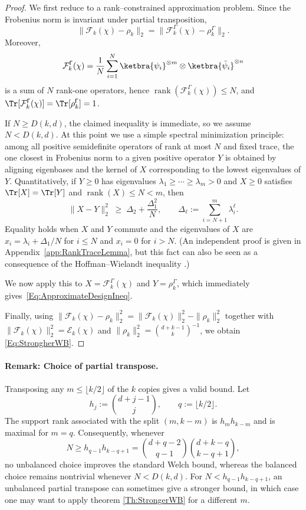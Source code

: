\documentclass[aps,twocolumn,pra,superscriptaddress,nofootinbib]{revtex4-2}
\begin{document}
\begin{proof}
We first reduce to a rank--constrained approximation problem.
Since the Frobenius norm is invariant under partial transposition,
\[
\|\mathcal F_k(\chi)-\rho_k\|_2=\|\mathcal F_{k}^{\mathsf{\Gamma}}(\chi)-\rho_k^{\mathsf{\Gamma}}\|_2.
\]
Moreover,
\[
\mathcal F_{k}^{\mathsf{\Gamma}}(\chi)
=\frac{1}{N}\sum_{i=1}^N
\ketbra{\psi_i}^{\otimes m}\otimes \ketbra{\bar\psi_i}^{\otimes n}
\]
is a sum of $N$ rank-one operators, hence $\operatorname{rank}(\mathcal F_{k}^{\mathsf{\Gamma}}(\chi))\le N$, and
$\Tr[\mathcal F_{k}^{\mathsf{\Gamma}}(\chi)]=\Tr[\rho_k^{\mathsf{\Gamma}}]=1$.

{If $N\ge D(k,d)$, the claimed inequality is immediate, so we assume $N<D(k,d)$.}
At this point we use a simple spectral minimization principle: among all positive semidefinite operators of rank at
most $N$ and fixed trace, the one closest in Frobenius norm to a given positive operator $Y$ is obtained by
aligning eigenbases and the kernel of $X$ corresponding to the lowest eigenvalues of $Y$. Quantitatively, if $Y\ge 0$ has
eigenvalues $\lambda_1\ge\cdots\ge\lambda_m>0$ and $X\ge0$ satisfies $\Tr[X]=\Tr[Y]$ and $\operatorname{rank}(X)\le N<m$, then
\begin{equation}\label{Eq:RankTraceFrob_inProof}
\|X-Y\|_2^2 \;\ge\; \Delta_2 + \frac{\Delta_1^2}{N},
\qquad
\Delta_\ell := \sum_{i={N+1}}^m {\lambda_i^\ell} .
\end{equation}
{Equality holds when $X$ and $Y$ commute and the eigenvalues of $X$ are
$x_i=\lambda_i+\Delta_1/N$ for $i\le N$ and $x_i=0$ for $i>N$.}
(An independent proof is given in Appendix~\ref{app:RankTraceLemma}, but this fact can also be seen as a consequence of the Hoffman--Wielandt inequality \cite{HoffmanWielandt1953}.)

We now apply this to $X=\mathcal F_{k}^{\mathsf{\Gamma}}(\chi)$ and $Y=\rho_k^{\mathsf{\Gamma}}$,
which immediately gives~\eqref{Eq:ApproximateDesignIneq}.

Finally, using $\|\mathcal F_k(\chi)-\rho_k\|_2^2=\|\mathcal F_k(\chi)\|_2^2-\|\rho_k\|_2^2$ together with
$\|\mathcal F_k(\chi)\|_2^2=\mathcal E_k(\chi)$ and $\|\rho_k\|_2^2=\binom{d+k-1}{k}^{-1}$, we obtain
\eqref{Eq:StrongherWB}.
\end{proof}
{\paragraph*{Remark: Choice of partial transpose.}
Transposing any $m\leq \lfloor k/2\rfloor$ of the $k$ copies gives a valid bound. Let
\[
h_j:=\binom{d+j-1}{j},
\qquad q:=\lfloor k/2\rfloor .
\]
The support rank associated with the split $(m,k-m)$ is $h_mh_{k-m}$ and is maximal for $m=q$. Consequently, whenever
\[
N\geq h_{q-1}h_{k-q+1}
=
\binom{d+q-2}{q-1}
\binom{d+k-q}{k-q+1},
\]
no unbalanced choice improves the standard Welch bound, whereas the balanced choice remains nontrivial whenever $N<D(k,d)$. For  $N<h_{q-1}h_{k-q+1}$, an unbalanced partial transpose can sometimes give a stronger bound, in which case one may want to apply theorem \ref{Th:StrongerWB} for a different $m$.}
\end{document}

